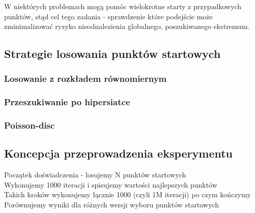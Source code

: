\documentclass{article}
\begin{document}
W niektórych problemach mogą pomóc wielokrotne starty z przypadkowych punktów, stąd cel tego zadania - sprawdzenie które podejście może zminimalizować ryzyko nieodnalezienia globalnego, poszukiwanego ekstremum.


\subsection{Strategie losowania punktów startowych}
\subsubsection{Losowanie z rozkładem równomiernym}
\subsubsection{Przeszukiwanie po hipersiatce}
\subsubsection{Poisson-disc}

\subsection{Koncepcja przeprowadzenia eksperymentu}

Początek doświadczenia - losujemy N punktów startowych \\
Wykonujemy 1000 iteracji i spisujemy wartości najlepszych punktów \\
Takich kroków wykonujemy łącznie 1000 (czyli 1M iteracji) po czym kończymy \\
Porównujemy wyniki dla różnych wersji wyboru punktów startowych \\
\end{document}
